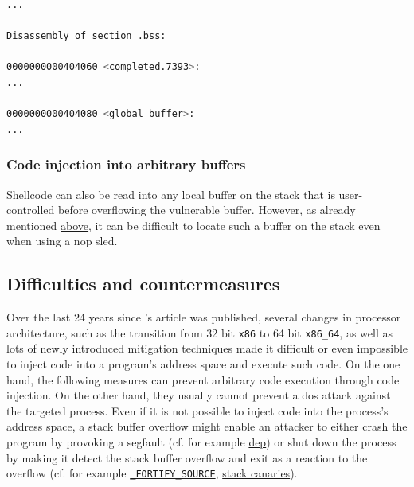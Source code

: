 \begin{lstlisting}[language=bash,float=ht,caption={Disassembly excerpt of the 64 bit binary compiled from the code in \cref{lst:local-global-buffer} with \texttt{gcc -o local-global-buffer local-global-buffer.c -no-pie}, retrieved with \texttt{objdump -D local-global-buffer}}, label={lst:local-global-buffer-disassembly}]
        ...

Disassembly of section .bss:

0000000000404060 <completed.7393>:
...

0000000000404080 <global_buffer>:
...
\end{lstlisting}

\subsubsection{Code injection into arbitrary buffers}
\label{subsubsec:ci-into-arbitrary-buffer}

Shellcode can also be read into any local buffer on the stack that is user-controlled before overflowing the vulnerable buffer.
However, as already mentioned \hyperref[subsubsec:ci-via-globals]{above}, it can be difficult to locate such a buffer on the stack even when using a \acs{nop} sled.

\subsection{Difficulties and countermeasures}
\label{subsec:ci-countermeasures}

Over the last 24 years since \citeauthor{AlephOne1996}'s article  was published, several changes in processor architecture, such as the transition from 32 bit \texttt{x86} to 64 bit \texttt{x86\_64}, as well as lots of newly introduced mitigation techniques made it difficult or even impossible to inject code into a program's address space and execute such code.
On the one hand, the following measures can prevent arbitrary code execution through code injection.
On the other hand, they usually cannot prevent a \gls{dos} attack against the targeted process.
Even if it is not possible to inject code into the process's address space, a stack buffer overflow might enable an attacker to either crash the program by provoking a \gls{segfault} (cf. for example \hyperref[subsubsec:ci-data-execution-prevention]{\acl{dep}}) or shut down the process by making it detect the stack buffer overflow and exit as a reaction to the overflow (cf. for example \hyperref[subsubsec:ci-fortify-source]{\texttt{\_FORTIFY\_SOURCE}}, \hyperref[subsubsec:ci-stack-canaries]{stack canaries}).

